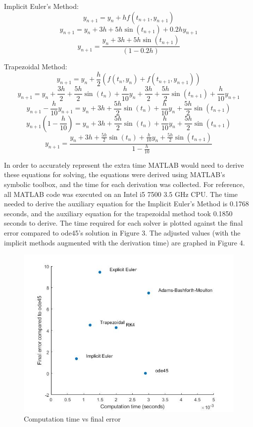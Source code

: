 \documentclass[11pt]{article}
\begin{document}
Implicit Euler's Method:
$$y_{n+1}=y_{n}+hf(t_{n+1}, y_{n+1})$$
$$y_{n+1}=y_{n}+3h+5h\sin(t_{n+1})+0.2hy_{n+1}$$
$$y_{n+1}=\frac{y_{n}+3h+5h\sin(t_{n+1})}{(1-0.2h)}$$

Trapezoidal Method:
$$y_{n+1}=y_{n}+\frac{h}{2}(f(t_{n},y_{n})+f(t_{n+1},y_{n+1}))$$
$$y_{n+1}=y_{n}+\frac{3h}{2}+\frac{5h}{2}\sin(t_{n})+\frac{h}{10}y_{n}+\frac{3h}{2}+\frac{5h}{2}\sin(t_{n+1})+\frac{h}{10}y_{n+1}$$
$$y_{n+1}-\frac{h}{10}y_{n+1}=y_{n}+3h+\frac{5h}{2}\sin(t_{n})+\frac{h}{10}y_{n}+\frac{5h}{2}\sin(t_{n+1})$$
$$y_{n+1}(1-\frac{h}{10})=y_{n}+3h+\frac{5h}{2}\sin(t_{n})+\frac{h}{10}y_{n}+\frac{5h}{2}\sin(t_{n+1})$$
$$
y_{n+1}=\frac{y_{n}+3h+\frac{5h}{2}\sin(t_{n})+\frac{h}{10}y_{n}+\frac{5h}{2}\sin(t_{n+1})}{1-\frac{h}{10}}$$

In order to accurately represent the extra time MATLAB would need to derive these
equations for solving, the equations were derived using MATLAB's symbolic
toolbox, and the time for each derivation was collected. For reference, all MATLAB
code was executed on an Intel i5 7500 3.5 GHz CPU. The time needed to derive
the auxiliary equation for the Implicit Euler's Method is  0.1768 seconds,
and the auxiliary equation for the trapezoidal method took 0.1850 seconds to derive.
The time required for each solver is plotted against the final error compared to 
ode45's solution in Figure 3. The adjusted values (with the implicit methods 
augmented with the derivation time) are graphed in Figure 4.

\begin{figure} [h]
\centering
        \includegraphics[totalheight=10cm]{scatter1.jpg}
    \caption{Computation time vs final error}
    \label{figure3}
\end{figure}
\end{document}
